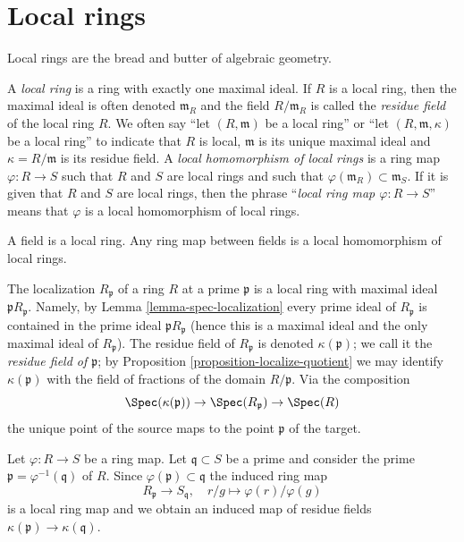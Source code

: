 \section{Local rings}
\label{section-local-rings}

\noindent
Local rings are the bread and butter of algebraic geometry.

\begin{definition}
\label{definition-local-ring}
A {\it local ring} is a ring with exactly one maximal ideal.
If $R$ is a local ring, then the maximal ideal is often denoted
$\mathfrak m_R$ and the field $R/\mathfrak m_R$ is called the
{\it residue field} of the local ring $R$.
We often say ``let $(R, \mathfrak m)$ be a local ring''
or ``let $(R, \mathfrak m, \kappa)$ be a local ring''
to indicate that $R$ is local, $\mathfrak m$ is its unique
maximal ideal and $\kappa = R/\mathfrak m$ is its residue field.
A {\it local homomorphism of local rings} is a ring map
$\varphi : R \to S$ such that $R$ and $S$ are local rings and such
that $\varphi(\mathfrak m_R) \subset \mathfrak m_S$.
If it is given that $R$ and $S$ are local rings, then the phrase
``{\it local ring map $\varphi : R \to S$}'' means that $\varphi$
is a local homomorphism of local rings.
\end{definition}

\noindent
A field is a local ring. Any ring map between fields is a local
homomorphism of local rings.

\medskip\noindent
The localization $R_\mathfrak p$ of a ring $R$ at a prime $\mathfrak p$
is a local ring with maximal ideal $\mathfrak p R_\mathfrak p$. Namely, by
Lemma \ref{lemma-spec-localization} every prime ideal of $R_\mathfrak p$
is contained in the prime ideal $\mathfrak p R_\mathfrak p$
(hence this is a maximal ideal and the only maximal ideal of $R_\mathfrak p$).
The residue field of $R_\mathfrak p$ is denoted $\kappa(\mathfrak p)$;
we call it the {\it residue field of $\mathfrak p$}; by
Proposition \ref{proposition-localize-quotient} we may identify
$\kappa(\mathfrak p)$ with the field of fractions of the domain $R/\mathfrak p$.
Via the composition
$$
\Spec(\kappa(\mathfrak p)) \to \Spec(R_\mathfrak p) \to \Spec(R)
$$
the unique point of the source maps to the point $\mathfrak p$ of the target.

\medskip\noindent
Let $\varphi : R \to S$ be a ring map. Let $\mathfrak q \subset S$ be a prime
and consider the prime $\mathfrak p = \varphi^{-1}(\mathfrak q)$ of $R$.
Since $\varphi(\mathfrak p) \subset \mathfrak q$ the induced ring map
$$
R_\mathfrak p \to S_\mathfrak q,\quad r/g \mapsto \varphi(r)/\varphi(g)
$$
is a local ring map and we obtain an induced map of residue fields
$\kappa(\mathfrak p) \to \kappa(\mathfrak q)$.


